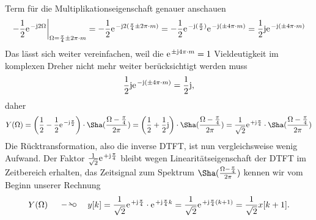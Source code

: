 \begin{ExCalc}
\begin{align}
\end{align}
Term für die Multiplikationseigenschaft genauer anschauen
\begin{align}
-\frac{1}{2}\e^{-\im 2 \Omega}\bigg|_{\Omega=\frac{\pi}{4}\pm 2\pi \cdot m} =
-\frac{1}{2}\e^{-\im 2 (\frac{\pi}{4}\pm 2\pi \cdot m)} =
-\frac{1}{2}\e^{-\im (\frac{\pi}{2})}\e^{-\im (\pm 4\pi \cdot m)}=
\frac{1}{2}\im\e^{-\im (\pm 4\pi \cdot m)}
\end{align}
%
Das lässt sich weiter vereinfachen, weil die $\e^{\pm \im 4 \pi \cdot m}=1$ Vieldeutigkeit
im komplexen Dreher nicht mehr weiter berücksichtigt werden muss
\begin{align}
\frac{1}{2}\im\e^{-\im (\pm 4\pi \cdot m)} = \frac{1}{2}\im,
\end{align}
daher
\begin{align}
Y(\Omega) = \left(\frac{1}{2} - \frac{1}{2} \e^{-\im \frac{\pi}{2}}\right)
\cdot
\Sha(\frac{\Omega-\frac{\pi}{4}}{2\pi}) =
\left(\frac{1}{2} + \frac{1}{2} \im \right)
\cdot
\Sha(\frac{\Omega-\frac{\pi}{4}}{2\pi}) =
\frac{1}{\sqrt{2}} \e^{+\im\frac{\pi}{4}}\cdot\Sha(\frac{\Omega-\frac{\pi}{4}}{2\pi})
\end{align}
Die Rücktransformation, also die inverse DTFT, ist nun vergleichsweise wenig Aufwand.
%
Der Faktor $\frac{1}{\sqrt{2}} \e^{+\im\frac{\pi}{4}}$ bleibt wegen Linearitätseigenschaft
der DTFT im Zeitbereich erhalten, das Zeitsignal zum Spektrum $\Sha(\frac{\Omega-\frac{\pi}{4}}{2\pi})$
kennen wir vom Beginn unserer Rechnung
\begin{align}
Y(\Omega) \quad\DTFT\quad y[k] = \frac{1}{\sqrt{2}} \e^{+\im\frac{\pi}{4}} \cdot \e^{+\im \frac{\pi}{4} k}=
\frac{1}{\sqrt{2}} \e^{+\im \frac{\pi}{4} (k+1)} = \frac{1}{\sqrt{2}} x[k+1].
\end{align}


\end{ExCalc}
